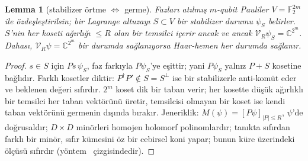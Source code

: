 \documentclass[aps,pra,onecolumn,superscriptaddress,nofootinbib,longbibliography,10pt]{revtex4-2}
\newtheorem{lemma}{Lemma}
\theoremstyle{definition}
\newcommand{\CC}{\mathbb C}
\newcommand{\FF}{\mathbb F}
\begin{document}
\begin{lemma}[stabilizer örtme $\Leftrightarrow$ germe]\label{lem:2}
Fazları atılmış $m$-qubit Pauliler $V=\FF_2^{2m}$ ile özdeşleştirilsin; bir Lagrange altuzayı $S\subset V$ bir stabilizer durumu $\psi_S$ belirler. $S$'nin her koseti ağırlığı $\le R$ olan bir temsilci içerir ancak ve ancak $\mathcal V_R\psi_S=\CC^{2^m}$. Dahası, $\mathcal V_R\psi=\CC^{2^m}$ bir durumda sağlanıyorsa Haar-hemen her durumda sağlanır.
\end{lemma}
\begin{proof}
$s\in S$ için $Ps\,\psi_S$, faz farkıyla $P\psi_S$'ye eşittir; yani $P\psi_S$ yalnız $P+S$ kosetine bağlıdır. Farklı kosetler diktir: $P^\dagger P'\notin S=S^\perp$ ise bir stabilizerle anti-komüt eder ve beklenen değeri sıfırdır. $2^m$ koset dik bir taban verir; her kosette düşük ağırlıklı bir temsilci her taban vektörünü üretir, temsilcisi olmayan bir koset ise kendi taban vektörünü germenin dışında bırakır. Jeneriklik: $M(\psi)=[P\psi]_{|P|\le R}$, $\psi$'de doğrusaldır; $D\times D$ minörleri homojen holomorf polinomlardır; tanıkta sıfırdan farklı bir minör, sıfır kümesini öz bir cebirsel koni yapar; bunun küre üzerindeki ölçüsü sıfırdır (yöntem~\cite{KJTV17} çizgisindedir).
\end{proof}
\end{document}
